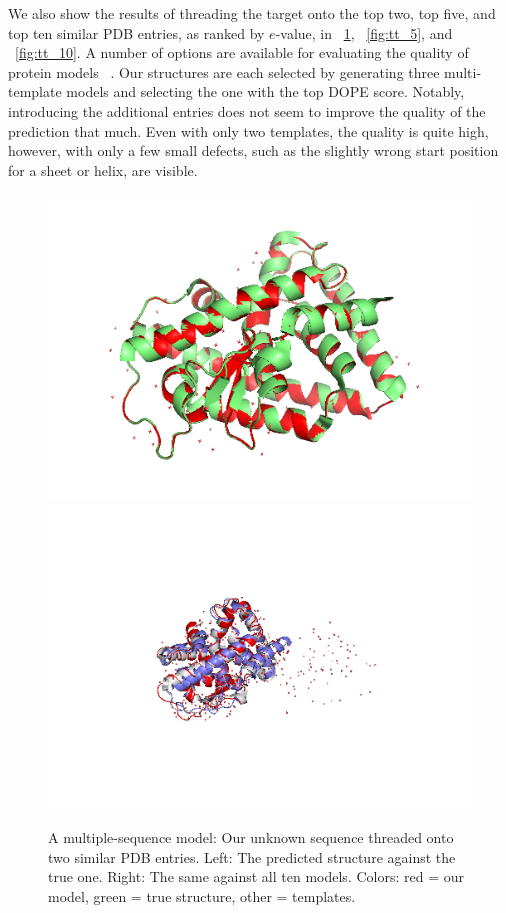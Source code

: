 \documentclass[notitlepage]{report}   %
\begin{document}
We also show the results of threading the target onto the top two, top five, and top ten similar PDB entries, as ranked by $e$-value, in \figurename~\ref{fig:tt_2}, \figurename~\ref{fig:tt_5}, and \figurename~\ref{fig:tt_10}. A number of options are available for evaluating the quality of protein models ~\cite{krysh}. Our structures are each selected by generating three multi-template models and selecting the one with the top DOPE score. Notably, introducing the additional entries does not seem to improve the quality of the prediction that much. Even with only two templates, the quality is quite high, however, with only a few small defects, such as the slightly wrong start position for a sheet or helix, are visible.

\begin{figure}[h!]
 \begin{center}
  \includegraphics[width=0.45\linewidth]{2_templates_truth.png}
  \includegraphics[width=0.45\linewidth]{2_templates.png}
  \caption{A multiple-sequence model: Our unknown sequence threaded onto two similar PDB entries. Left: The predicted structure against the true one. Right: The same against all ten models. Colors: red = our model, green = true structure, other = templates.}
  \label{fig:tt_2}
 \end{center}
\end{figure}
\end{document}

